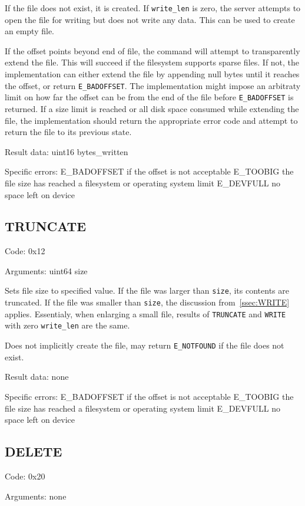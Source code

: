 If the file does not exist, it is created. If {\tt write\_len} is zero, the server attempts to open the file
for writing but does not write any data. This can be used to create an empty file.

If the offset points beyond end of file, the command will attempt to transparently extend the file. This will
succeed if the filesystem supports sparse files. If not, the implementation can either extend the file by
appending null bytes until it reaches the offset, or return {\tt E\_BADOFFSET}. The implementation might
impose an arbitraty limit on how far the offset can be from the end of the file before {\tt E\_BADOFFSET} is
returned. If a size limit is reached or all disk space consumed while extending the file, the implementation
should return the appropriate error code and attempt to return the file to its previous state.

Result data:
uint16 bytes\_written

Specific errors:
	E\_BADOFFSET if the offset is not acceptable
	E\_TOOBIG the file size has reached a filesystem or operating system limit
	E\_DEVFULL no space left on device

\subsection{TRUNCATE}

Code: 0x12

Arguments:
uint64 size

Sets file size to specified value. If the file was larger than {\tt size}, its contents are truncated. If the
file was smaller than {\tt size}, the discussion from~\ref{ssec:WRITE} applies. Essentialy, when enlarging
a small file, results of {\tt TRUNCATE} and {\tt WRITE} with zero {\tt write\_len} are the same.

Does not implicitly create the file, may return {\tt E\_NOTFOUND} if the file does not exist.

Result data: none

Specific errors:
	E\_BADOFFSET if the offset is not acceptable
	E\_TOOBIG the file size has reached a filesystem or operating system limit
	E\_DEVFULL no space left on device

\subsection{DELETE}

Code: 0x20

Arguments: none

